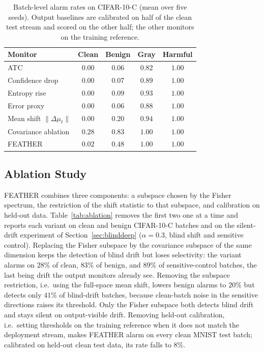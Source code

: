 \documentclass[conference]{IEEEtran}
\begin{document}
\begin{table}[t]
\caption{Batch-level alarm rates on CIFAR-10-C (mean over five seeds). Output
baselines are calibrated on half of the clean test stream and scored on the
other half; the other monitors on the training reference.}
\label{tab:alarms}
\centering
\footnotesize
\begin{tabular}{lcccc}
\hline
Monitor & Clean & Benign & Gray & Harmful \\
\hline
ATC \cite{garg2022atc} & $0.00$ & $\mathbf{0.06}$ & $0.82$ & $1.00$ \\
Confidence drop & $0.00$ & $0.07$ & $0.89$ & $1.00$ \\
Entropy rise & $0.00$ & $0.09$ & $0.93$ & $1.00$ \\
Error proxy \cite{amoukou2024sequential} & $0.00$ & $\mathbf{0.06}$ & $0.88$ & $1.00$ \\
\hline
Mean shift $\lVert\Delta\mu_t\rVert$ & $0.00$ & $0.20$ & $0.94$ & $1.00$ \\
Covariance ablation & $0.28$ & $0.83$ & $1.00$ & $1.00$ \\
FEATHER & $0.02$ & $0.48$ & $1.00$ & $1.00$ \\
\hline
\end{tabular}
\end{table}

\subsection{Ablation Study}
\label{sec:ablation}

FEATHER combines three components: a subspace chosen by the Fisher spectrum,
the restriction of the shift statistic to that subspace, and calibration on
held-out data. Table~\ref{tab:ablation} removes the first two one at a time
and reports each variant on clean and benign CIFAR-10-C batches and on the
silent-drift experiment of Section~\ref{sec:blinddeep} ($\alpha=0.3$, blind
shift and sensitive control). Replacing the Fisher subspace by the
covariance subspace of the same dimension keeps the detection of blind drift
but loses selectivity: the variant alarms on $28\%$ of clean, $83\%$ of benign,
and $89\%$ of sensitive-control batches, the last being drift the output
monitors already see. Removing the subspace restriction, i.e.\ using the
full-space mean shift, lowers benign alarms to $20\%$ but detects only $41\%$
of blind-drift batches, because clean-batch noise in the sensitive directions
raises its threshold. Only the Fisher subspace both detects blind drift and
stays silent on output-visible drift. Removing held-out calibration, i.e.\
setting thresholds on the training reference when it does not match the
deployment stream, makes FEATHER alarm on every clean MNIST test batch;
calibrated on held-out clean test data, its rate falls to $8\%$.
\end{document}

